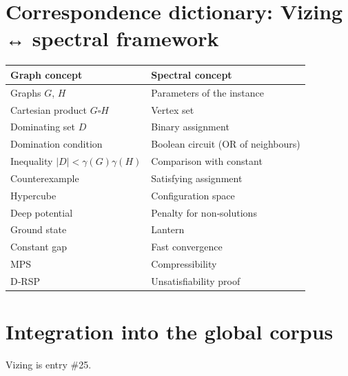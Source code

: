 \documentclass[11pt,a4paper]{article}
\begin{document}
\section{Correspondence dictionary: Vizing ↔ spectral framework}

\begin{center}
\small
\begin{tabular}{@{}l|l@{}}
\toprule
\textbf{Graph concept} & \textbf{Spectral concept} \\
\midrule
Graphs $G$, $H$ & Parameters of the instance \\
Cartesian product $G \square H$ & Vertex set \\
Dominating set $D$ & Binary assignment \\
Domination condition & Boolean circuit (OR of neighbours) \\
Inequality $|D| < \gamma(G)\gamma(H)$ & Comparison with constant \\
Counterexample & Satisfying assignment \\
Hypercube & Configuration space \\
Deep potential & Penalty for non‑solutions \\
Ground state & Lantern \\
Constant gap & Fast convergence \\
MPS & Compressibility \\
D‑RSP & Unsatisfiability proof \\
\bottomrule
\end{tabular}
\end{center}

\section{Integration into the global corpus}

Vizing is entry \#25.
\end{document}
